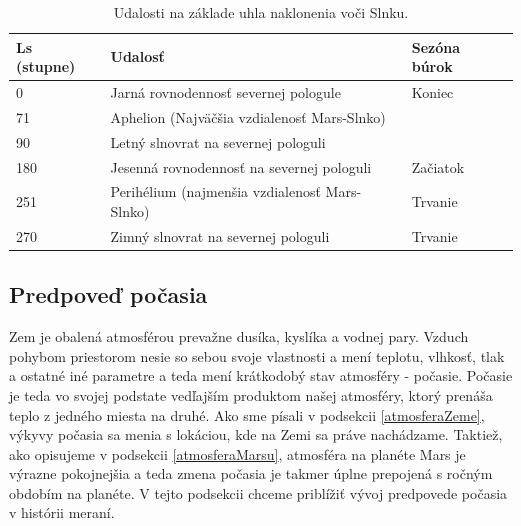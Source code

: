 \begin{table}[!htbp]
\caption{Udalosti na základe uhla naklonenia voči Slnku.}
\centering
\begin{tabular}{|l|l|l|}
\hline 
Ls (stupne) & Udalosť                                       & Sezóna búrok     \\ \hline
0           & Jarná rovnodennosť severnej pologule          & Koniec    \\ \hline
71          & Aphelion (Najväčšia vzdialenosť Mars-Slnko)   &           \\ \hline
90          & Letný slnovrat na severnej pologuli           &           \\ \hline
180         & Jesenná rovnodennosť na severnej pologuli     & Začiatok  \\ \hline
251         & Perihélium (najmenšia vzdialenosť Mars-Slnko) & Trvanie   \\ \hline
270         & Zimný slnovrat na severnej pologuli           & Trvanie   \\ \hline                                      
\end{tabular}
\end{table}

\newpage
\subsection{Predpoveď počasia}
Zem je obalená atmosférou prevažne dusíka, kyslíka a vodnej pary. Vzduch pohybom priestorom nesie so sebou svoje vlastnosti a mení teplotu, vlhkosť, tlak a ostatné iné parametre a teda mení krátkodobý stav atmosféry - počasie. Počasie je teda vo svojej podstate vedľajším produktom našej atmosféry, ktorý prenáša teplo z jedného miesta na druhé.
Ako sme písali v podsekcii \ref{atmosferaZeme}, výkyvy počasia sa menia s lokáciou, kde na Zemi sa práve nachádzame. Taktiež, ako opisujeme v podsekcii \ref{atmosferaMarsu}, atmosféra na planéte Mars je výrazne pokojnejšia a teda zmena počasia je takmer úplne prepojená s ročným obdobím na planéte.
V tejto podsekcii chceme priblížiť vývoj predpovede počasia v histórii meraní.

